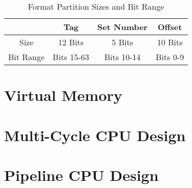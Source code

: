 \documentclass[11pt]{article}
\begin{document}
\begin{table}[H]
	\centering
	\caption*{Format Partition Sizes and Bit Range}
	\begin{tabular}{| c | c | c | c |}
		\hline
					&	Tag		&	Set Number		&	Offset\\
		\hline
		Size			&	12 Bits		&	5 Bits		&	10 Bits\\
		\hline
		Bit Range		&	Bits 15-63		&	Bits 10-14		&	Bits 0-9\\
		\hline
	\end{tabular}
\end{table}


\section{Virtual Memory}

\section{Multi-Cycle CPU Design}

\section{Pipeline CPU Design}
\end{document}
